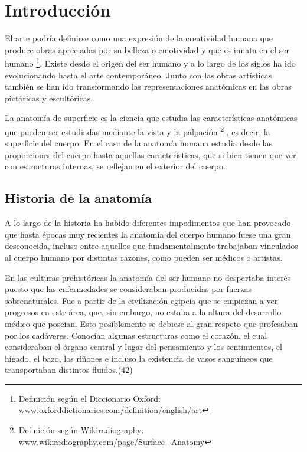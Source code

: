 \section{Introducción} %
El arte podría definirse como una expresión de la creatividad humana que produce obras apreciadas por su belleza o emotividad y que es innata en el ser humano \footnote{Definición según el Diccionario Oxford: www.oxforddictionaries.com/definition/english/art}. Existe desde el origen del ser humano y  %
a lo largo de los siglos ha ido evolucionando hasta el arte contemporáneo. Junto con las obras artísticas también se han ido transformando las representaciones anatómicas en las obras pictóricas y escultóricas.

La anatomía de superficie es la ciencia que estudia las características anatómicas que pueden ser estudiadas mediante la vista y la palpación \footnote{Definición según Wikiradiography: www.wikiradiography.com/page/Surface+Anatomy}%
, es decir, la superficie del cuerpo. En el caso de la anatomía humana estudia desde las proporciones del cuerpo hasta  aquellas características, que si bien tienen que ver con estructuras internas, se reflejan en el exterior del cuerpo.%

\subsection{Historia de la anatomía}
A lo largo de la historia ha habido diferentes impedimentos que han provocado que hasta épocas muy recientes la anatomía del cuerpo humano fuese una gran desconocida, incluso entre aquellos que fundamentalmente trabajaban vinculados al cuerpo humano por distintas razones, como pueden ser médicos o artistas.

En las culturas prehistóricas la anatomía del ser humano no despertaba interés puesto que las enfermedades se consideraban producidas por fuerzas sobrenaturales. Fue a partir de la civilización egipcia que se empiezan a ver progresos en este área, que, sin embargo, no estaba a la altura del desarrollo médico que poseían. Esto posiblemente se debiese al gran respeto que profesaban por los cadáveres. Conocían algunas estructuras como el corazón, el cual consideraban el órgano central y lugar del pensamiento y los sentimientos, el hígado, el bazo, los riñones e incluso la existencia de vasos sanguíneos que transportaban distintos fluidos.(42)

